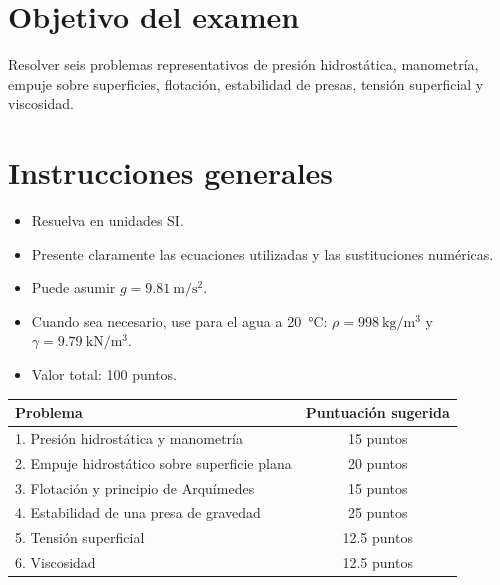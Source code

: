 \documentclass[11pt]{article}
\begin{document}

\section{Objetivo del examen}
Resolver seis problemas representativos de presión hidrostática, manometría, empuje sobre superficies, flotación, estabilidad de presas, tensión superficial y viscosidad.

\section{Instrucciones generales}
\begin{itemize}
\item Resuelva en unidades SI.
\item Presente claramente las ecuaciones utilizadas y las sustituciones numéricas.
\item Puede asumir $g = \SI{9.81}{\meter\per\second\squared}$.
\item Cuando sea necesario, use para el agua a \SI{20}{\celsius}: $\rho = \SI{998}{\kilogram\per\meter\cubed}$ y $\gamma = \SI{9.79}{\kilo\newton\per\meter\cubed}$.
\item Valor total: \SI{100}{} puntos.
\end{itemize}

\begin{center}
\begin{tabular}{lc}
\toprule
\textbf{Problema} & \textbf{Puntuación sugerida} \\
\midrule
1. Presión hidrostática y manometría & 15 puntos \\
2. Empuje hidrostático sobre superficie plana & 20 puntos \\
3. Flotación y principio de Arquímedes & 15 puntos \\
4. Estabilidad de una presa de gravedad & 25 puntos \\
5. Tensión superficial & 12.5 puntos \\
6. Viscosidad & 12.5 puntos \\
\bottomrule
\end{tabular}
\end{center}
\end{document}
